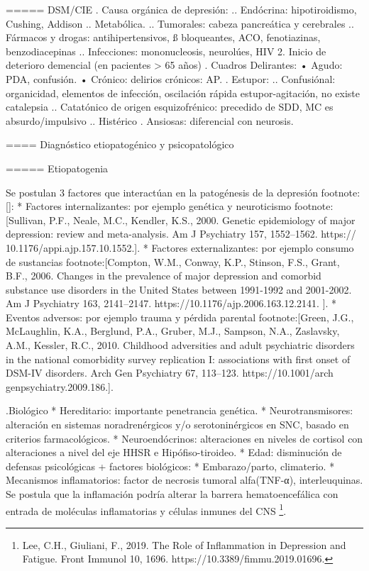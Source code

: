 \documentclass[encares.tex]{subfiles}
\begin{document}
===== DSM/CIE
. Causa orgánica de depresión:
.. Endócrina: hipotiroidismo, Cushing, Addison
.. Metabólica.
.. Tumorales: cabeza pancreática y cerebrales
.. Fármacos y drogas: antihipertensivos, ß bloqueantes, ACO, fenotiazinas, benzodiacepinas
.. Infecciones: mononucleosis, neurolúes, HIV 2. Inicio de deterioro demencial (en pacientes > 65 años)
. Cuadros Delirantes: • Agudo: PDA, confusión. • Crónico: delirios crónicos: AP.
. Estupor:
.. Confusiónal: organicidad, elementos de infección, oscilación rápida estupor-agitación, no existe catalepsia
.. Catatónico de origen esquizofrénico: precedido de SDD, MC es absurdo/impulsivo
.. Histérico
. Ansiosas: diferencial con neurosis.

==== Diagnóstico etiopatogénico y psicopatológico

===== Etiopatogenia

Se postulan 3 factores que interactúan en la patogénesis de la depresión footnote:[]:
* Factores internalizantes: por ejemplo genética y neuroticismo footnote:[Sullivan, P.F., Neale, M.C., Kendler, K.S., 2000. Genetic epidemiology of major
depression: review and meta-analysis. Am J Psychiatry 157, 1552–1562. https://
10.1176/appi.ajp.157.10.1552.].
* Factores externalizantes: por ejemplo consumo de sustancias footnote:[Compton, W.M., Conway, K.P., Stinson, F.S., Grant, B.F., 2006. Changes in the
prevalence of major depression and comorbid substance use disorders in the United
States between 1991-1992 and 2001-2002. Am J Psychiatry 163, 2141–2147.
https://10.1176/ajp.2006.163.12.2141. ].
* Eventos adversos: por ejemplo trauma y pérdida parental footnote:[Green, J.G., McLaughlin, K.A., Berglund, P.A., Gruber, M.J., Sampson, N.A.,
Zaslavsky, A.M., Kessler, R.C., 2010. Childhood adversities and adult psychiatric
disorders in the national comorbidity survey replication I: associations with first
onset of DSM-IV disorders. Arch Gen Psychiatry 67, 113–123. https://10.1001/arch
genpsychiatry.2009.186.].

.Biológico
* Hereditario: importante penetrancia genética.
* Neurotransmisores: alteración en sistemas noradrenérgicos y/o serotoninérgicos en SNC, basado en criterios farmacológicos.
* Neuroendócrinos: alteraciones en niveles de cortisol con alteraciones a nivel del eje HHSR e Hipófiso-tiroideo.
* Edad: disminución de defensas psicológicas + factores biológicos:
* Embarazo/parto, climaterio.
* Mecanismos inflamatorios: factor de necrosis tumoral alfa(TNF-α), interleuquinas. Se postula que la inflamación podría alterar la barrera hematoencefálica con entrada de moléculas inflamatorias y células inmunes del CNS \footnote{Lee, C.H., Giuliani, F., 2019. The Role of Inflammation in Depression and Fatigue. Front
Immunol 10, 1696. https://10.3389/fimmu.2019.01696.}.
\end{document}
